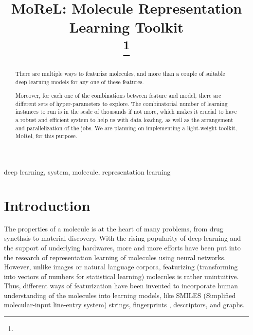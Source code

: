 \documentclass[conference]{IEEEtran}
\begin{document}
\title{MoReL: Molecule Representation Learning Toolkit\\
	{
		\footnotesize \textsuperscript{}
	}
		\thanks{}
}

\author{
}

\maketitle

\begin{abstract}

There are multiple ways to featurize molecules, and more than a couple of suitable deep learning models for any one of these features. 

Moreover, for each one of the combinations between feature and model, there are different sets of hyper-parameters to explore. 
The combinatorial number of learning instances to run is in the scale of thousands if not more, which makes it crucial to have a robust and efficient system to help us with data loading, as well as the arrangement and parallelization of the jobs. 
We are planning on implementing a light-weight toolkit, MoRel, for this purpose. 

\end{abstract}

\begin{IEEEkeywords}
deep learning, system, molecule, representation learning
\end{IEEEkeywords}

\section{Introduction} \label{sec_intro} 

The properties of a molecule is at the heart of many problems, from drug synethsis to material discovery. 
With the rising popularity of deep learning and the support of underlying hardwares, more and more efforts have been put into the research of representation learning of molecules using neural networks. 
However, unlike images or natural language corpora, featurizing (transforming into vectors of numbers for statistical learning) molecules is rather unintuitive. 
Thus, different ways of featurization have been invented to incorporate human understanding of the molecules into learning models, like SMILES (Simplified molecular-input line-entry system) strings, fingerprints \cite{ecfp}, descriptors, and graphs. 
\end{document}
